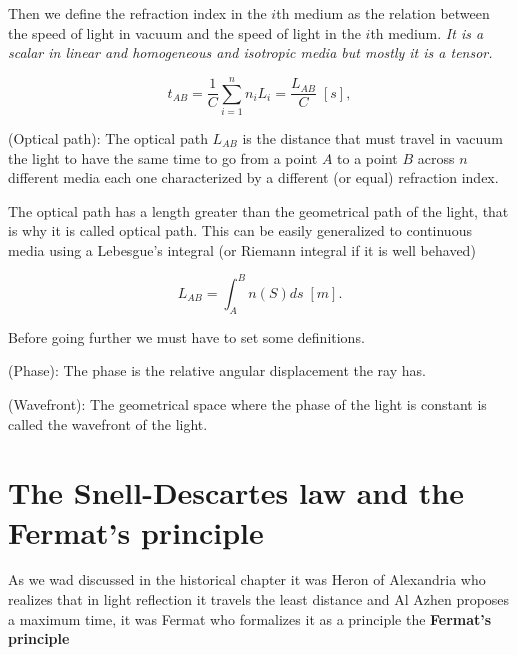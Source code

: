         Then we define the refraction index in the $i$th medium as the relation between the speed of light in vacuum and the speed of light in the $i$th medium. \textit{It is a scalar in linear and homogeneous and isotropic media but mostly it is a tensor.} 

        \begin{equation}
            t_{AB} = \frac{1}{C}\sum_{i=1}^nn_iL_i = \frac{L_{AB}}{C}\;[s],
        \end{equation}

        \begin{myDef}
            (Optical path): The optical path $L_{AB}$ is the distance that must travel in vacuum the light to have the same time to go from a point $A$ to a point $B$ across $n$ different media each one characterized by a different (or equal) refraction index.
        \end{myDef}

        The optical path has a length greater than the geometrical path of the light, that is why it is called optical path. This can be easily generalized to continuous media using a Lebesgue's integral (or Riemann integral if it is well behaved)

        \begin{equation}
            L_{AB} = \int_A^Bn(S)ds\;[m].
        \end{equation}

        Before going further we must have to set some definitions.

        \begin{myDef}
            (Phase): The phase is the relative angular displacement the ray has.
        \end{myDef}

        \begin{myDef}
            (Wavefront): The geometrical space where the phase of the light is constant is called the wavefront of the light.
        \end{myDef}

    \section{The Snell-Descartes law and the Fermat's principle }

        As we wad discussed in the historical chapter it was Heron of Alexandria who realizes that in light reflection it travels the least distance and Al Azhen proposes a maximum time, it was Fermat who formalizes it as a principle the \textbf{Fermat's principle}

